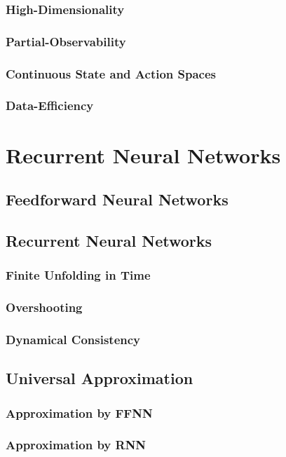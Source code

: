\documentclass[officiallayout]{tktla}
\begin{document}
\subsection{High-Dimensionality}
\subsection{Partial-Observability}
\subsection{Continuous State and Action Spaces}
\subsection{Data-Efficiency}

\chapter{Recurrent Neural Networks}
\section{Feedforward Neural Networks}
\section{Recurrent Neural Networks}
\subsection{Finite Unfolding in Time}
\subsection{Overshooting}
\subsection{Dynamical Consistency}
\section{Universal Approximation}
\subsection{Approximation by FFNN}

\subsection{Approximation by RNN}
\end{document}
